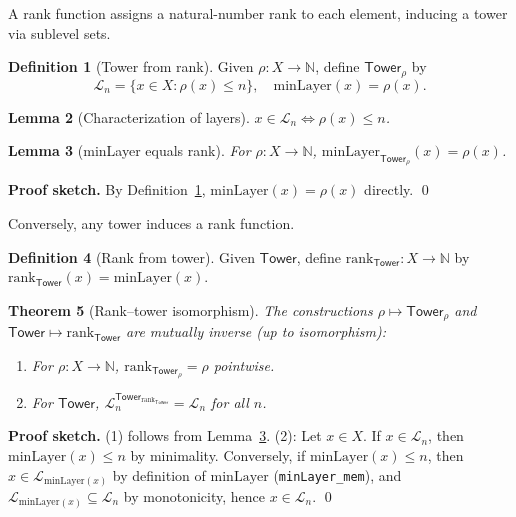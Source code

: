 \documentclass[11pt]{article}
\newtheorem{theorem}{Theorem}[section]
\newtheorem{lemma}[theorem]{Lemma}
\theoremstyle{definition}
\newtheorem{definition}[theorem]{Definition}
\theoremstyle{remark}
\newcommand{\layer}{\mathcal{L}}
\newcommand{\minLayer}{\mathrm{minLayer}}
\newcommand{\rank}{\mathrm{rank}}
\newcommand{\Tower}{\mathsf{Tower}}
\newcommand{\NN}{\mathbb{N}}
\begin{document}
A rank function assigns a natural-number rank to each element, inducing a tower via sublevel sets.

\begin{definition}[Tower from rank]
\label{def:tower-from-rank}
Given $\rho: X \to \NN$, define $\Tower_\rho$ by
\[
\layer_n = \{x \in X : \rho(x) \leq n\}, \quad \minLayer(x) = \rho(x).
\]
\end{definition}

\begin{lemma}[Characterization of layers]
\label{lem:tower-from-rank-layer}
$x \in \layer_n \iff \rho(x) \leq n$.
\end{lemma}

\begin{lemma}[minLayer equals rank]
\label{lem:minlayer-eq-rank}
For $\rho: X \to \NN$, $\minLayer_{\Tower_\rho}(x) = \rho(x)$.
\end{lemma}

\noindent\textbf{Proof sketch.}
By Definition~\ref{def:tower-from-rank}, $\minLayer(x) = \rho(x)$ directly.
\qed

Conversely, any tower induces a rank function.

\begin{definition}[Rank from tower]
\label{def:rank-from-tower}
Given $\Tower$, define $\rank_\Tower: X \to \NN$ by $\rank_\Tower(x) = \minLayer(x)$.
\end{definition}

\begin{theorem}[Rank--tower isomorphism]
\label{thm:rank-tower-iso}
The constructions $\rho \mapsto \Tower_\rho$ and $\Tower \mapsto \rank_\Tower$ are mutually inverse (up to isomorphism):
\begin{enumerate}
\item For $\rho: X \to \NN$, $\rank_{\Tower_\rho} = \rho$ pointwise.
\item For $\Tower$, $\layer_n^{\Tower_{\rank_\Tower}} = \layer_n$ for all $n$.
\end{enumerate}
\end{theorem}

\noindent\textbf{Proof sketch.}
(1) follows from Lemma~\ref{lem:minlayer-eq-rank}.
(2): Let $x \in X$. If $x \in \layer_n$, then $\minLayer(x) \leq n$ by minimality.
Conversely, if $\minLayer(x) \leq n$, then $x \in \layer_{\minLayer(x)}$ by definition of $\minLayer$ (\texttt{minLayer\_mem}), and $\layer_{\minLayer(x)} \subseteq \layer_n$ by monotonicity, hence $x \in \layer_n$.
\qed
\end{document}
